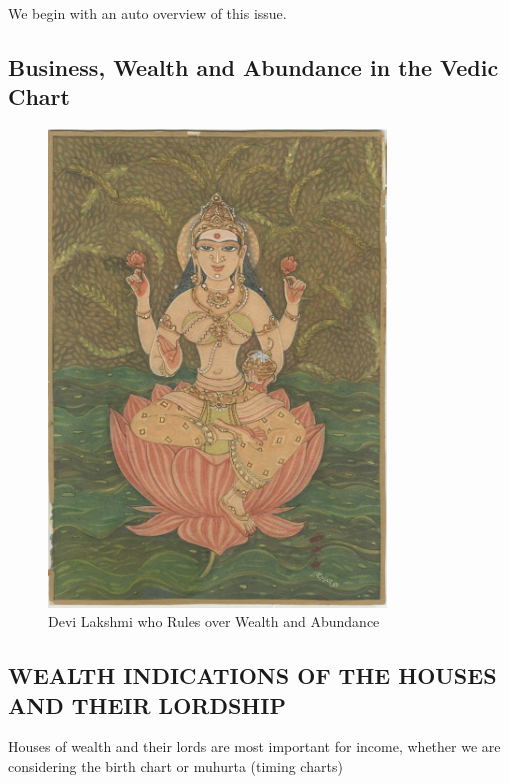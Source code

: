 We begin with an auto overview of this issue.


\subsection{\textbf{Business, Wealth and Abundance in the Vedic Chart}}

\begin{figure}[H]
 \centering
\includegraphics[width=0.8\textwidth]{pics/business1.png}
\caption{Devi Lakshmi who Rules over Wealth and Abundance}
 \end{figure}





 

\subsection{WEALTH INDICATIONS OF THE HOUSES AND THEIR LORDSHIP}
 

Houses of wealth and their lords are most important for income, whether we are considering the birth chart or muhurta (timing charts)

 

